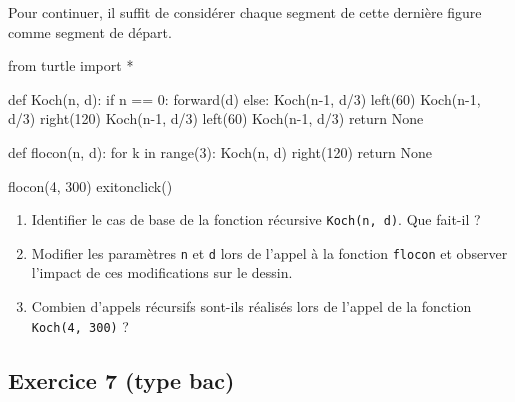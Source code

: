 \documentclass[
  letterpaper,
  DIV=11,
  numbers=noendperiod]{scrartcl}
\newenvironment{Shaded}{\begin{snugshade}}{\end{snugshade}}
\newcommand{\BuiltInTok}[1]{\textcolor[rgb]{0.00,0.23,0.31}{#1}}
\newcommand{\ControlFlowTok}[1]{\textcolor[rgb]{0.00,0.23,0.31}{#1}}
\newcommand{\DecValTok}[1]{\textcolor[rgb]{0.68,0.00,0.00}{#1}}
\newcommand{\ImportTok}[1]{\textcolor[rgb]{0.00,0.46,0.62}{#1}}
\newcommand{\KeywordTok}[1]{\textcolor[rgb]{0.00,0.23,0.31}{#1}}
\newcommand{\NormalTok}[1]{\textcolor[rgb]{0.00,0.23,0.31}{#1}}
\newcommand{\OperatorTok}[1]{\textcolor[rgb]{0.37,0.37,0.37}{#1}}
\newcommand{\VariableTok}[1]{\textcolor[rgb]{0.07,0.07,0.07}{#1}}
\providecommand{\tightlist}{%
  \setlength{\itemsep}{0pt}\setlength{\parskip}{0pt}}\usepackage{longtable,booktabs,array}
\begin{document}
Pour continuer, il suffit de considérer chaque segment de cette dernière
figure comme segment de départ.

\begin{Shaded}
\begin{Highlighting}[]
\ImportTok{from}\NormalTok{ turtle }\ImportTok{import} \OperatorTok{*}


\KeywordTok{def}\NormalTok{ Koch(n, d):}
    \ControlFlowTok{if}\NormalTok{ n }\OperatorTok{==} \DecValTok{0}\NormalTok{:}
\NormalTok{        forward(d)}
    \ControlFlowTok{else}\NormalTok{:}
\NormalTok{        Koch(n}\OperatorTok{{-}}\DecValTok{1}\NormalTok{, d}\OperatorTok{/}\DecValTok{3}\NormalTok{)}
\NormalTok{        left(}\DecValTok{60}\NormalTok{)}
\NormalTok{        Koch(n}\OperatorTok{{-}}\DecValTok{1}\NormalTok{, d}\OperatorTok{/}\DecValTok{3}\NormalTok{)}
\NormalTok{        right(}\DecValTok{120}\NormalTok{)}
\NormalTok{        Koch(n}\OperatorTok{{-}}\DecValTok{1}\NormalTok{, d}\OperatorTok{/}\DecValTok{3}\NormalTok{)}
\NormalTok{        left(}\DecValTok{60}\NormalTok{)}
\NormalTok{        Koch(n}\OperatorTok{{-}}\DecValTok{1}\NormalTok{, d}\OperatorTok{/}\DecValTok{3}\NormalTok{)}
    \ControlFlowTok{return} \VariableTok{None}


\KeywordTok{def}\NormalTok{ flocon(n, d):}
    \ControlFlowTok{for}\NormalTok{ k }\KeywordTok{in} \BuiltInTok{range}\NormalTok{(}\DecValTok{3}\NormalTok{):}
\NormalTok{        Koch(n, d)}
\NormalTok{        right(}\DecValTok{120}\NormalTok{)}
    \ControlFlowTok{return} \VariableTok{None}


\NormalTok{flocon(}\DecValTok{4}\NormalTok{, }\DecValTok{300}\NormalTok{)}
\NormalTok{exitonclick()}
\end{Highlighting}
\end{Shaded}

\begin{enumerate}
\def\labelenumi{\arabic{enumi}.}
\tightlist
\item
  Identifier le cas de base de la fonction récursive
  \texttt{Koch(n,\ d)}. Que fait-il ?
\item
  Modifier les paramètres \texttt{n} et \texttt{d} lors de l'appel à la
  fonction \texttt{flocon} et observer l'impact de ces modifications sur
  le dessin.
\item
  Combien d'appels récursifs sont-ils réalisés lors de l'appel de la
  fonction \texttt{Koch(4,\ 300)} ?
\end{enumerate}

\hypertarget{fa-solid-pencil-alt-exercice-7-type-bac}{%
\subsection{\texorpdfstring{ Exercice 7 (type
bac)}{ Exercice 7 (type bac)}}\label{fa-solid-pencil-alt-exercice-7-type-bac}}
\end{document}

